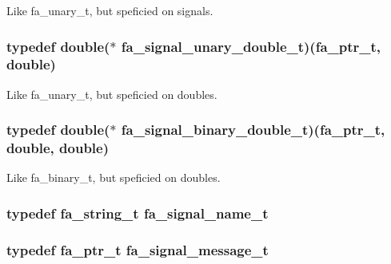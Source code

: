 Like fa\-\_\-unary\-\_\-t, but speficied on signals. 

\hypertarget{group___fa_signal_gaced7eb8d67eb2fe39927934c4abc7255}{
\subsubsection[{fa\-\_\-signal\-\_\-unary\-\_\-double\-\_\-t}]{\setlength{\rightskip}{0pt plus 5cm}typedef double($\ast$  fa\-\_\-signal\-\_\-unary\-\_\-double\-\_\-t)({\bf fa\-\_\-ptr\-\_\-t}, double)}}\label{group___fa_signal_gaced7eb8d67eb2fe39927934c4abc7255}


Like fa\-\_\-unary\-\_\-t, but speficied on doubles. 

\hypertarget{group___fa_signal_ga7593031729bc7c15d5da9a06ce3eaf4a}{
\subsubsection[{fa\-\_\-signal\-\_\-binary\-\_\-double\-\_\-t}]{\setlength{\rightskip}{0pt plus 5cm}typedef double($\ast$  fa\-\_\-signal\-\_\-binary\-\_\-double\-\_\-t)({\bf fa\-\_\-ptr\-\_\-t}, double, double)}}\label{group___fa_signal_ga7593031729bc7c15d5da9a06ce3eaf4a}


Like fa\-\_\-binary\-\_\-t, but speficied on doubles. 

\hypertarget{group___fa_signal_gabb3471c5e8fbc3ab8657964de4200d37}{
\subsubsection[{fa\-\_\-signal\-\_\-name\-\_\-t}]{\setlength{\rightskip}{0pt plus 5cm}typedef {\bf fa\-\_\-string\-\_\-t} {\bf fa\-\_\-signal\-\_\-name\-\_\-t}}}\label{group___fa_signal_gabb3471c5e8fbc3ab8657964de4200d37}
\hypertarget{group___fa_signal_ga655db48baa224e32e8fc00f33179b46e}{
\subsubsection[{fa\-\_\-signal\-\_\-message\-\_\-t}]{\setlength{\rightskip}{0pt plus 5cm}typedef {\bf fa\-\_\-ptr\-\_\-t} {\bf fa\-\_\-signal\-\_\-message\-\_\-t}}}\label{group___fa_signal_ga655db48baa224e32e8fc00f33179b46e}


